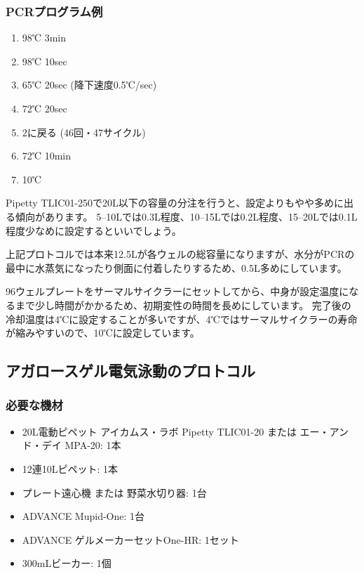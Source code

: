 \documentclass[titlepage,10pt,a4paper]{jsbook}
\begin{document}
\subsubsection{PCRプログラム例}
\begin{enumerate}
\item 98℃ 3min
\item 98℃ 10sec
\item 65℃ 20sec (降下速度0.5℃/sec)
\item 72℃ 20sec
\item 2に戻る (46回・47サイクル)
\item 72℃ 10min
\item 10℃
\end{enumerate}

Pipetty TLIC01-250で20{\textmu}L以下の容量の分注を行うと、設定よりもやや多めに出る傾向があります。
5--10{\textmu}Lでは0.3{\textmu}L程度、10--15{\textmu}Lでは0.2{\textmu}L程度、15--20{\textmu}Lでは0.1{\textmu}L程度少なめに設定するといいでしょう。

上記プロトコルでは本来12.5{\textmu}Lが各ウェルの総容量になりますが、水分がPCRの最中に水蒸気になったり側面に付着したりするため、0.5{\textmu}L多めにしています。

96ウェルプレートをサーマルサイクラーにセットしてから、中身が設定温度になるまで少し時間がかかるため、初期変性の時間を長めにしています。
完了後の冷却温度は4℃に設定することが多いですが、4℃ではサーマルサイクラーの寿命が縮みやすいので、10℃に設定しています。

\subsection{アガロースゲル電気泳動のプロトコル}

\subsubsection{必要な機材}
\begin{itemize}
\item 20{\textmu}L電動ピペット アイカムス・ラボ Pipetty TLIC01-20 または エー・アンド・デイ MPA-20: 1本
\item 12連10{\textmu}Lピペット: 1本
\item プレート遠心機 または 野菜水切り器: 1台
\item ADVANCE Mupid-One: 1台
\item ADVANCE ゲルメーカーセットOne-HR: 1セット
\item 300mLビーカー: 1個
\end{itemize}
\end{document}
